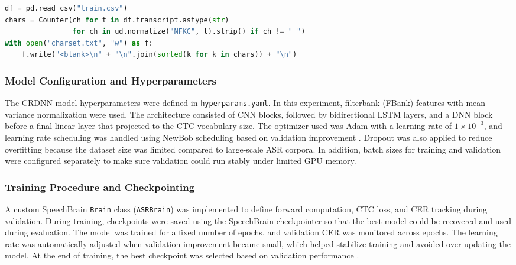 \begin{adjustwidth}{-1.4cm}{-1.4cm}
\begin{lstlisting}[language=Python, breaklines=true, basicstyle=\ttfamily\small,
caption={Character vocabulary generation for CTC}, label={lst:ctc-charset}]
df = pd.read_csv("train.csv")
chars = Counter(ch for t in df.transcript.astype(str)
                for ch in ud.normalize("NFKC", t).strip() if ch != " ")
with open("charset.txt", "w") as f:
    f.write("<blank>\n" + "\n".join(sorted(k for k in chars)) + "\n")
\end{lstlisting}
\end{adjustwidth}

\subsubsection{Model Configuration and Hyperparameters}
The CRDNN model hyperparameters were defined in \texttt{hyperparams.yaml}. In this experiment, filterbank (FBank) features with mean-variance normalization were used. The architecture consisted of CNN blocks, followed by bidirectional LSTM layers, and a DNN block before a final linear layer that projected to the CTC vocabulary size. The optimizer used was Adam with a learning rate of $1\times10^{-3}$, and learning rate scheduling was handled using NewBob scheduling based on validation improvement \parencite{speechbrain_v1}. Dropout was also applied to reduce overfitting because the dataset size was limited compared to large-scale ASR corpora. In addition, batch sizes for training and validation were configured separately to make sure validation could run stably under limited GPU memory.

\subsubsection{Training Procedure and Checkpointing}
A custom SpeechBrain \texttt{Brain} class (\texttt{ASRBrain}) was implemented to define forward computation, CTC loss, and CER tracking during validation. During training, checkpoints were saved using the SpeechBrain checkpointer so that the best model could be recovered and used during evaluation. The model was trained for a fixed number of epochs, and validation CER was monitored across epochs. The learning rate was automatically adjusted when validation improvement became small, which helped stabilize training and avoided over-updating the model. At the end of training, the best checkpoint was selected based on validation performance \parencite{speechbrain_v1}.

